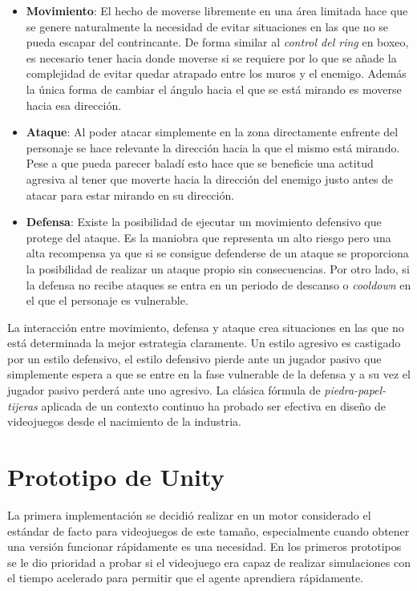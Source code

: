 \begin{itemize}
	\item \textbf{Movimiento}: El hecho de moverse libremente en una área limitada hace que se genere naturalmente la necesidad de evitar situaciones en las que no se pueda escapar del contrincante. De forma similar al \textit{control del ring} en boxeo, es necesario tener hacia donde moverse si se requiere por lo que se añade la complejidad de evitar quedar atrapado entre los muros y el enemigo. Además la única forma de cambiar el ángulo hacia el que se está mirando es moverse hacia esa dirección.
	\item \textbf{Ataque}: Al poder atacar simplemente en la zona directamente enfrente del personaje se hace relevante la dirección hacia la que el mismo está mirando. Pese a que pueda parecer baladí esto hace que se beneficie una actitud agresiva al tener que moverte hacia la dirección del enemigo justo antes de atacar para estar mirando en su dirección.
	\item \textbf{Defensa}: Existe la posibilidad de ejecutar un movimiento defensivo que protege del ataque. Es la maniobra que representa un alto riesgo pero una alta recompensa ya que si se consigue defenderse de un ataque se proporciona la posibilidad de realizar un ataque propio sin consecuencias. Por otro lado, si la defensa no recibe ataques se entra en un periodo de descanso o \textit{cooldown} en el que el personaje es vulnerable.
\end{itemize}

\bigskip

La interacción entre movimiento, defensa y ataque crea situaciones en las que no está determinada la mejor estrategia claramente. Un estilo agresivo es castigado por un estilo defensivo, el estilo defensivo pierde ante un jugador pasivo que simplemente espera a que se entre en la fase vulnerable de la defensa y a su vez el jugador pasivo perderá ante uno agresivo. La clásica fórmula de \textit{piedra-papel-tijeras} aplicada de un contexto continuo ha probado ser efectiva en diseño de videojuegos desde el nacimiento de la industria.

\section{Prototipo de Unity}


La primera implementación se decidió realizar en un motor considerado el estándar de facto para videojuegos de este tamaño, especialmente cuando obtener una versión funcionar rápidamente es una necesidad. En los primeros prototipos se le dio prioridad a probar si el videojuego era capaz de realizar simulaciones con el tiempo acelerado para permitir que el agente aprendiera rápidamente. 

